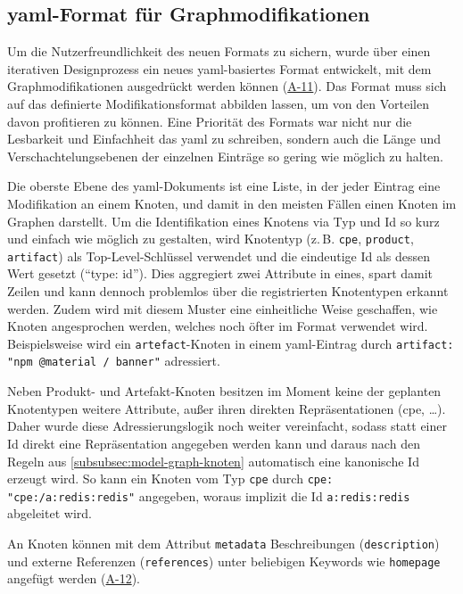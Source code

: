 \subsection{\acrshort{yaml}-Format für Graphmodifikationen}\label{subsec:modell-graph-modification-yaml}

Um die Nutzerfreundlichkeit des neuen Formats zu sichern, wurde über einen iterativen Designprozess ein neues \acrshort{yaml}-basiertes Format entwickelt, mit dem Graphmodifikationen ausgedrückt werden können (\hyperref[subsec:req-manual-format-modification-for-real]{A-11}).
Das Format muss sich auf das definierte Modifikationsformat abbilden lassen, um von den Vorteilen davon profitieren zu können.
Eine Priorität des Formats war nicht nur die Lesbarkeit und Einfachheit das \acrshort{yaml} zu schreiben, sondern auch die Länge und Verschachtelungsebenen der einzelnen Einträge so gering wie möglich zu halten.

Die oberste Ebene des \acrshort{yaml}-Dokuments ist eine Liste, in der jeder Eintrag eine Modifikation an einem Knoten, und damit in den meisten Fällen einen Knoten im Graphen darstellt.
Um die Identifikation eines Knotens via Typ und Id so kurz und einfach wie möglich zu gestalten, wird Knotentyp (z.\,B. \texttt{cpe}, \texttt{product}, \texttt{artifact}) als Top-Level-Schlüssel verwendet und die eindeutige Id als dessen Wert gesetzt (\enquote{type: id}).
Dies aggregiert zwei Attribute in eines, spart damit Zeilen und kann dennoch problemlos über die registrierten Knotentypen erkannt werden.
Zudem wird mit diesem Muster eine einheitliche Weise geschaffen, wie Knoten angesprochen werden, welches noch öfter im Format verwendet wird.
Beispielsweise wird ein \texttt{artefact}-Knoten in einem \acrshort{yaml}-Eintrag durch \texttt{artifact: "npm @material / banner"} adressiert.

Neben Produkt- und Artefakt-Knoten besitzen im Moment keine der geplanten Knotentypen weitere Attribute, außer ihren direkten Repräsentationen (\acrshort{cpe}, \ldots).
Daher wurde diese Adressierungslogik noch weiter vereinfacht, sodass statt einer Id direkt eine Repräsentation angegeben werden kann und daraus nach den Regeln aus \autoref{subsubsec:model-graph-knoten} automatisch eine kanonische Id erzeugt wird.
So kann ein Knoten vom Typ \texttt{cpe} durch \texttt{cpe: "cpe:/a:redis:redis"} angegeben, woraus implizit die Id \texttt{a:redis:redis} abgeleitet wird.

An Knoten können mit dem Attribut \texttt{metadata} Beschreibungen (\texttt{description}) und externe Referenzen (\texttt{references}) unter beliebigen Keywords wie \texttt{homepage} angefügt werden (\hyperref[subsec:req-reason-format]{A-12}).

